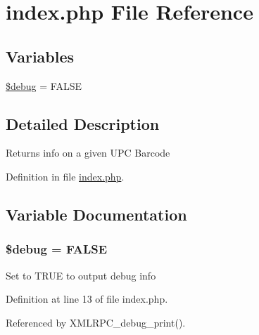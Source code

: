 \hypertarget{index_8php}{
\section{index.php File Reference}
\label{index_8php}
}
\subsection*{Variables}
\begin{CompactItemize}
\item 
\hyperlink{index_8php_85ae3e64cd40e9564adceb010085e9dd}{\$debug} = FALSE
\end{CompactItemize}


\subsection{Detailed Description}
Returns info on a given UPC Barcode 

Definition in file \hyperlink{index_8php-source}{index.php}.

\subsection{Variable Documentation}
\hypertarget{index_8php_85ae3e64cd40e9564adceb010085e9dd}{
\subsubsection{\setlength{\rightskip}{0pt plus 5cm}\$debug = FALSE}}
\label{index_8php_85ae3e64cd40e9564adceb010085e9dd}


Set to TRUE to output debug info 

Definition at line 13 of file index.php.

Referenced by XMLRPC\_\-debug\_\-print().